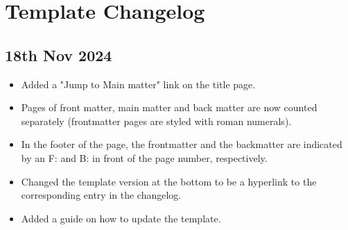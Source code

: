 \chapter*{Template Changelog}

\section*{18th Nov 2024} \label{sec:changelog:2024/11/18}
\begin{itemize}
    \item Added a "Jump to Main matter" link on the title page.
    \item Pages of front matter, main matter and back matter are now counted separately (frontmatter pages are styled with roman numerals).
    \item In the footer of the page, the frontmatter and the backmatter are indicated by an F: and B: in front of the page number, respectively.
    \item Changed the template version at the bottom to be a hyperlink to the corresponding entry in the changelog.
    \item Added a guide on how to update the template.
\end{itemize}